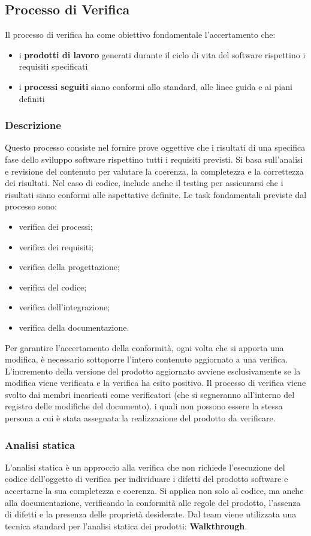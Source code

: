 \subsection{Processo di Verifica}
\label{subsec:proc_verifica}
Il processo di verifica ha come obiettivo fondamentale l'accertamento che:
\begin{itemize}
    \item i \textbf{prodotti di lavoro} generati durante il ciclo di vita del software rispettino i requisiti specificati
    \item i \textbf{processi seguiti} siano conformi allo standard, alle linee guida e ai piani definiti
\end{itemize}
\subsubsection{Descrizione}
Questo processo consiste nel fornire prove oggettive che i risultati di una specifica fase dello sviluppo software rispettino tutti i requisiti previsti. 
Si basa sull’analisi e revisione del contenuto per valutare la coerenza, la completezza e la correttezza dei risultati. Nel caso di codice, include anche il testing per assicurarsi che i risultati siano conformi alle aspettative definite.
Le task fondamentali previste dal processo sono:
\begin{itemize}
    \item verifica dei processi;
    \item verifica dei requisiti;
    \item verifica della progettazione;
    \item verifica del codice;
    \item verifica dell'integrazione;
    \item verifica della documentazione.
\end{itemize}
Per garantire l'accertamento della conformità, ogni volta che si apporta una modifica, è necessario sottoporre l'intero contenuto aggiornato a una verifica. 
L'incremento della versione del prodotto aggiornato avviene esclusivamente se la modifica viene verificata e la verifica ha esito positivo.
Il processo di verifica viene svolto dai membri incaricati come verificatori (che si segneranno all'interno del registro delle modifiche del documento). 
i quali non possono essere la stessa persona a cui è stata assegnata la realizzazione del prodotto da verificare.
\subsubsection{Analisi statica}
L'analisi statica è un approccio alla verifica che non richiede l'esecuzione del codice dell'oggetto di verifica per individuare i difetti del prodotto software 
e accertarne la sua completezza e coerenza.
Si applica non solo al codice, ma anche alla documentazione, verificando la conformità alle regole del prodotto, l'assenza di difetti e la presenza delle proprietà desiderate.
Dal team viene utilizzata una tecnica standard per l'analisi statica dei prodotti: \textbf{Walkthrough}.
